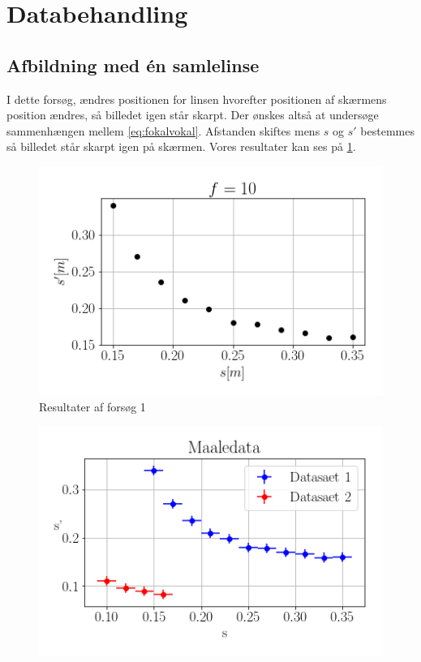 \section{Databehandling}
\subsection{Afbildning med én samlelinse}
I dette forsøg, ændres positionen for linsen hvorefter positionen af skærmens position ændres, så billedet igen står skarpt. Der ønskes altså at undersøge sammenhængen mellem \cref{eq:fokalvokal}. Afstanden skiftes mens $s$ og $s'$ bestemmes så billedet står skarpt igen på skærmen.
Vores resultater kan ses på \cref{fig:res1}.
\begin{figure}[H]
    \includegraphics[width=\linewidth]{res1.png}
    \caption{Resultater af forsøg 1}
    \label{fig:res1}
\end{figure}


\begin{figure}[H]
    \includegraphics[width=\linewidth]{usikkerhed.png}
    \caption{}
    \label{fig:usikkerhed}
\end{figure}

